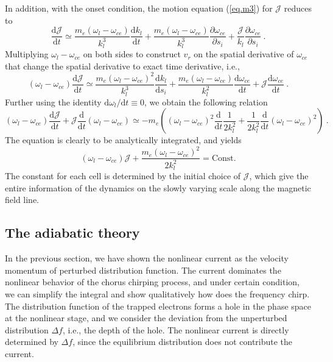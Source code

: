 In addition, with the onset condition, the motion equation (\ref{eq.m3}) for $\mathcal{J}$ reduces to
\begin{equation}
        \frac{\mathrm{d}\mathcal{J}}{\mathrm{d}t} \simeq  \frac{m_e(\omega_l - \omega_{ce})}{k_l^3} \frac{\mathrm{d} k_l}{\mathrm{d} t} + \frac{m_e(\omega_l - \omega_{ce})}{k_l^3} \frac{\partial \omega_{ce}}{\partial s_i}  +\frac{\mathcal{J}}{k_l}\frac{\partial \omega_{ce}}{\partial s_i}~.
\end{equation}
Multiplying $\omega_l - \omega_{ce}$ on both sides to construct $v_r$ on the spatial derivative of $\omega_{ce}$ that change the spatial derivative to exact time derivative, i.e., 
\begin{equation}
    (\omega_l - \omega_{ce}) \frac{\mathrm{d}\mathcal{J}}{\mathrm{d}t} \simeq  \frac{m_e(\omega_l - \omega_{ce})^2}{k_l^3} \frac{\mathrm{d} k_l}{\mathrm{d} s_i} + \frac{m_e(\omega_l - \omega_{ce})}{k_l^2} \frac{\mathrm{d} \omega_{ce}}{\mathrm{d} t} + \mathcal{J}\frac{\mathrm{d} \omega_{ce}}{\mathrm{d} t}~.
\end{equation}
Further using the identity $\mathrm{d}\omega_l/\mathrm{d}t \equiv 0$, we obtain the following relation
\begin{equation}
    (\omega_l - \omega_{ce}) \frac{\mathrm{d}\mathcal{J}}{\mathrm{d}t} + \mathcal{J}\frac{\mathrm{d}}{\mathrm{d} t}(\omega_l - \omega_{ce}) \simeq - m_e\left((\omega_l - \omega_{ce})^2 \frac{\mathrm{d}}{\mathrm{d} t}\frac{1}{2 k_l^2} + \frac{1}{2 k_l^2} \frac{\mathrm{d}}{\mathrm{d} t}(\omega_l - \omega_{ce})^2\right)~.
\end{equation}
The equation is clearly to be analytically integrated, and yields
\begin{equation}\label{eq.Jcons}
    (\omega_l - \omega_{ce})\mathcal{J} +  \frac{m_e(\omega_l - \omega_{ce})^2}{2k_l^2} = \mathrm{Const.}
\end{equation}
The constant for each cell is determined by the initial choice of $\mathcal{J}$, which give the entire information of the dynamics on the slowly varying scale along the magnetic field line.

\subsection{The adiabatic theory}
In the previous section, we have shown the nonlinear current as the velocity momentum of perturbed distribution function. 
The current dominates the nonlinear behavior of the chorus chirping process, and under certain condition, we can simplify the integral and show qualitatively how does the frequency chirp.
The distribution function of the trapped electrons forms a hole in the phase space at the nonlinear stage, and we consider the deviation from the unperturbed distribution $\Delta f$, i.e., the depth of the hole.
The nonlinear current is directly determined by $\Delta f$, since the equilibrium distribution does not contribute the current.

